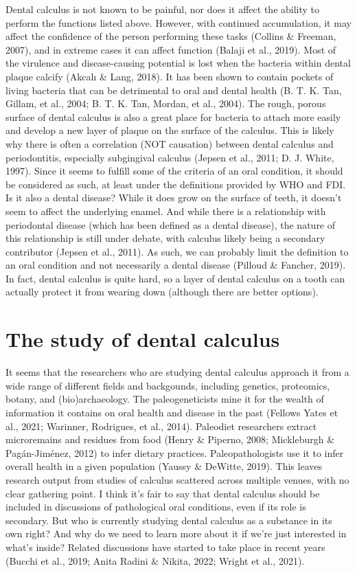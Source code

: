 \documentclass[
  letterpaper,
]{book}
\begin{document}
Dental calculus is not known to be painful, nor does it affect the
ability to perform the functions listed above. However, with continued
accumulation, it may affect the confidence of the person performing
these tasks (Collins \& Freeman, 2007), and in extreme cases it can
affect function (Balaji et al., 2019). Most of the virulence and
disease-causing potential is lost when the bacteria within dental plaque
calcify (Akcalı \& Lang, 2018). It has been shown to contain pockets of
living bacteria that can be detrimental to oral and dental health (B. T.
K. Tan, Gillam, et al., 2004; B. T. K. Tan, Mordan, et al., 2004). The
rough, porous surface of dental calculus is also a great place for
bacteria to attach more easily and develop a new layer of plaque on the
surface of the calculus. This is likely why there is often a correlation
(NOT causation) between dental calculus and periodontitis, especially
subgingival calculus (Jepsen et al., 2011; D. J. White, 1997). Since it
seems to fulfill some of the criteria of an oral condition, it should be
considered as such, at least under the definitions provided by WHO and
FDI. Is it also a dental disease? While it does grow on the surface of
teeth, it doesn't seem to affect the underlying enamel. And while there
is a relationship with periodontal disease (which has been defined as a
dental disease), the nature of this relationship is still under debate,
with calculus likely being a secondary contributor (Jepsen et al.,
2011). As such, we can probably limit the definition to an oral
condition and not necessarily a dental disease (Pilloud \& Fancher,
2019). In fact, dental calculus is quite hard, so a layer of dental
calculus on a tooth can actually protect it from wearing down (although
there are better options).

\hypertarget{intro-study}{%
\section{The study of dental calculus}\label{intro-study}}

It seems that the researchers who are studying dental calculus approach
it from a wide range of different fields and backgounds, including
genetics, proteomics, botany, and (bio)archaeology. The paleogeneticists
mine it for the wealth of information it contains on oral health and
disease in the past (Fellows Yates et al., 2021; Warinner, Rodrigues, et
al., 2014). Paleodiet researchers extract microremains and residues from
food (Henry \& Piperno, 2008; Mickleburgh \& Pagán-Jiménez, 2012) to
infer dietary practices. Paleopathologists use it to infer overall
health in a given population (Yaussy \& DeWitte, 2019). This leaves
research output from studies of calculus scattered across multiple
venues, with no clear gathering point. I think it's fair to say that
dental calculus should be included in discussions of pathological oral
conditions, even if its role is secondary. But who is currently studying
dental calculus as a substance in its own right? And why do we need to
learn more about it if we're just interested in what's inside? Related
discussions have started to take place in recent years (Bucchi et al.,
2019; Anita Radini \& Nikita, 2022; Wright et al., 2021).
\end{document}
